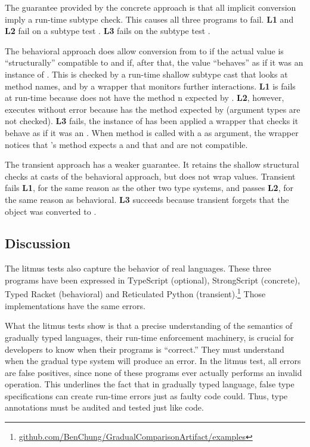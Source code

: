 \documentclass[USenglish]{tex/lipics-v2016}f
\begin{document}
\vspace{2mm} The guarantee provided by the
concrete approach is that all implicit conversion imply a run-time subtype
check.  This causes all three programs to fail. {\bf L1} and
{\bf L2} fail on a subtype test \StrSub{}\K\A\I.  {\bf L3} fails on the
subtype test \StrSub{}\K\C\E.

\vspace{2mm} The behavioral approach does allow
conversion from \any to \C if the actual value is ``structurally''
compatible to \C and if, after that, the value ``behaves'' as if it was an
instance of \C.  This is checked by a run-time shallow subtype cast that
looks at method names, and by a wrapper that monitors further interactions.
{\bf L1} is fails at run-time because \A does not have the method \xt n expected by
\I. {\bf L2}, however, executes without error because \A has the method \m
expected by \I (argument types are not checked). {\bf L3} fails, the
instance of \C has been applied a wrapper that checks it behave as if it was
an \E.  When method \a is called with a \C as argument, the wrapper notices
that \E's method \a expects a \D and that \C and \D are not compatible.

\vspace{2mm} The transient approach has a weaker
guarantee. It retains the shallow structural checks at casts of the
behavioral approach, but does not wrap values. Transient fails {\bf L1}, for
the same reason as the other two type systems, and passes {\bf L2}, for the
same reason as behavioral.  {\bf L3} succeeds because transient forgets that
the \C object was converted to \E.

\subsection{Discussion}

The litmus tests also capture the behavior of real languages. These three
programs have been expressed in TypeScript (optional), StrongScript
(concrete), Typed Racket (behavioral) and Reticulated Python
(transient).\footnote{\small
  \url{github.com/BenChung/GradualComparisonArtifact/examples}} Those
implementations have the same errors.

What the litmus tests show is that a precise understanding of the semantics of
gradually typed languages, their run-time enforcement machinery, is crucial
for developers to know when their programs is ``correct.'' They must
understand when the gradual type system will produce an error. In
the litmus test, all errors are false positives, since none of these programs ever
actually performs an invalid operation. This underlines the fact that in 
gradually typed language, false type specifications can create run-time
errors just as faulty code could. Thus, type annotations must be audited 
and tested just like code.
\end{document}
